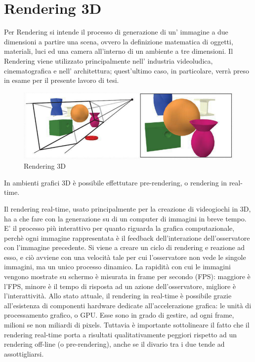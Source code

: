 \section{Rendering 3D}
\label{sec:chapter_stato_arte_rendering3d}

Per Rendering si intende il processo di generazione di un’ immagine a due dimensioni a partire una scena, ovvero la definizione matematica di oggetti, materiali, luci ed una camera all’interno di un ambiente a tre dimensioni.
Il Rendering viene utilizzato principalmente nell’ industria videoludica, cinematografica e nell’ architettura; quest’ultimo caso, in particolare, verrà preso in esame per il presente lavoro di tesi.

\begin{figure}[htb]
 \centering
 \includegraphics[width=1.0\linewidth]{images/chapter_stato_arte/stato_arte_rendering_3d.png}\hfill
 \caption[Rendering 3D]{Rendering 3D}
 \label{fig:stato_arte_rendering_3d}
\end{figure}

In ambienti grafici 3D è possibile effettutare pre-rendering, o rendering in real-time.

Il rendering real-time, usato principalmente per la creazione di videogiochi in 3D, ha a che fare con la generazione su di un computer di immagini in breve tempo. E’ il processo più interattivo per quanto riguarda la grafica computazionale, perchè ogni immagine rappresentata è il feedback dell’interazione dell’osservatore con l’immagine precedente. Si viene a creare un ciclo di rendering e reazione ad esso, e ciò avviene con una velocità tale per cui l’osservatore non vede le singole immagini, ma un unico processo dinamico. La rapidità con cui le immagini vengono mostrate su schermo è misurata in frame per secondo (FPS): maggiore è l’FPS, minore è il tempo di risposta ad un azione dell’osservatore, migliore è l’interattività. Allo stato attuale, il rendering in real-time è possibile grazie all’esistenza di componenti hardware dedicate all’accelerazione grafica: le unità di processamento grafico, o GPU. Esse sono in grado di gestire, ad ogni frame, milioni se non miliardi di pixels. Tuttavia è importante sottolineare il fatto che il rendering real-time porta a risultati qualitativamente peggiori rispetto ad un rendering off-line (o pre-rendering), anche se il divario tra i due tende ad assottigliarsi.

